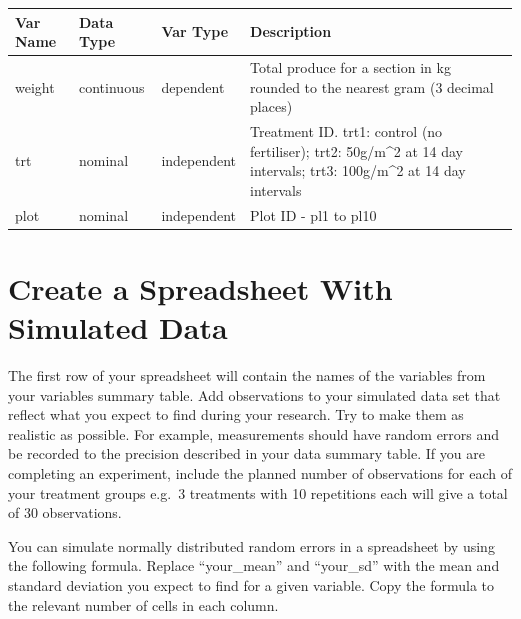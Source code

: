 \documentclass[
]{book}
\begin{document}
\begin{longtable}[]{@{}
  >{\raggedright\arraybackslash}p{}
  >{\raggedright\arraybackslash}p{}
  >{\raggedright\arraybackslash}p{}
  >{\raggedright\arraybackslash}p{}@{}}
\toprule\noalign{}
\begin{minipage}[b]{\linewidth}\raggedright
Var Name
\end{minipage} & \begin{minipage}[b]{\linewidth}\raggedright
Data Type
\end{minipage} & \begin{minipage}[b]{\linewidth}\raggedright
Var Type
\end{minipage} & \begin{minipage}[b]{\linewidth}\raggedright
Description
\end{minipage} \\
\midrule\noalign{}
\endhead
\bottomrule\noalign{}
\endlastfoot
weight & continuous & dependent & Total produce for a section in kg rounded to the nearest gram (3 decimal places) \\
trt & nominal & independent & Treatment ID. trt1: control (no fertiliser); trt2: 50g/m\^{}2 at 14 day intervals; trt3: 100g/m\^{}2 at 14 day intervals \\
plot & nominal & independent & Plot ID - pl1 to pl10 \\
\end{longtable}

\section{Create a Spreadsheet With Simulated Data}\label{create-a-spreadsheet-with-simulated-data}

The first row of your spreadsheet will contain the names of the variables from your variables summary table. Add observations to your simulated data set that reflect what you expect to find during your research. Try to make them as realistic as possible. For example, measurements should have random errors and be recorded to the precision described in your data summary table. If you are completing an experiment, include the planned number of observations for each of your treatment groups e.g.~3 treatments with 10 repetitions each will give a total of 30 observations.

You can simulate normally distributed random errors in a spreadsheet by using the following formula. Replace ``your\_mean'' and ``your\_sd'' with the mean and standard deviation you expect to find for a given variable. Copy the formula to the relevant number of cells in each column.
\end{document}
